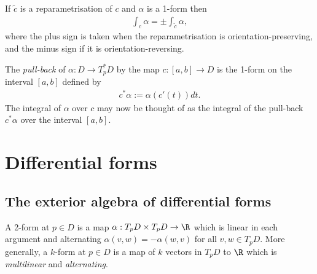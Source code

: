 \documentclass{article}
\begin{document}
\begin{proposition}
    If $\tilde c$ is a reparametrisation of $c$ and $\alpha$ is a 1-form then 
    \begin{align*}
        \int_c \alpha = \pm \int_{\tilde c} \alpha,
    \end{align*}
    where the plus sign is taken when the reparametrisation is orientation-preserving,
    and the minus sign if it is orientation-reversing.
\end{proposition}

\begin{definition}
    The \emph{pull-back} of $\alpha:D\to T_p^*D$ by the map $c:[a,b]\to D$ is the 1-form on the
    interval $[a,b]$ defined by
    \begin{align*}
        c^*\alpha :=  \alpha(c'(t))dt.
    \end{align*}
    The integral of $\alpha$ over $c$ may now be thought of as the integral of the pull-back 
    $c^*\alpha$ over the interval $[a,b]$.
\end{definition}

\section{Differential forms}

\subsection{The exterior algebra of differential forms}

\begin{definition}
    A 2-form at $p\in D$ is a map $\alpha:T_pD\times T_p D \to \R$ which is linear in each argument
    and alternating $\alpha(v,w)=-\alpha(w,v)$ for all $v,w\in T_pD$. More generally, a $k$-form at
    $p\in D$ is a map of $k$ vectors in $T_pD$ to $\R$ which is \emph{multilinear} and \emph{alternating}.
\end{definition}
\end{document}
